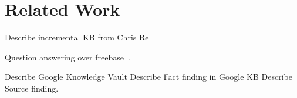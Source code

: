 

\section{Related Work}

Describe incremental KB from Chris Re

Question answering over freebase~\cite{yao2014information}.

Describe Google Knowledge Vault 
Describe Fact finding in Google KB
Describe Source finding.

